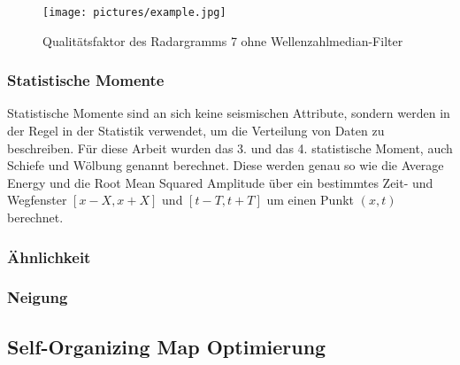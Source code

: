 \begin{figure}[H]
    \centering
    \texttt{[image: pictures/example.jpg]}
    \caption{Qualitätsfaktor des Radargramms 7 ohne Wellenzahlmedian-Filter}
    \label{fig:quality_factor}
\end{figure}

\subsubsection{Statistische Momente}

Statistische Momente sind an sich keine seismischen Attribute, sondern werden in der Regel in der Statistik verwendet, um die Verteilung von Daten zu beschreiben. Für diese Arbeit wurden das 3. und das 4. statistische Moment, auch Schiefe und Wölbung genannt berechnet. Diese werden genau so wie die Average Energy und die Root Mean Squared Amplitude über ein bestimmtes Zeit- und Wegfenster $\left[x-X, x+X\right]$ und $\left[t-T, t+T\right]$ um einen Punkt $(x,t)$ berechnet. 

\subsubsection{Ähnlichkeit}
\subsubsection{Neigung}

\subsection{Self-Organizing Map Optimierung}
\lipsum[1-5]